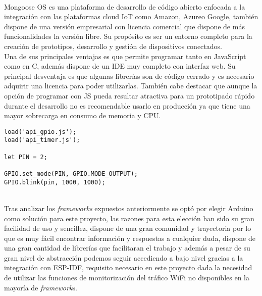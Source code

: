 \documentclass[../proyecto.tex]{subfiles}
\begin{document}
\\
Mongoose OS es una plataforma de desarrollo de código abierto enfocada a la integración con las plataformas cloud IoT como Amazon, Azureo Google, también dispone de una versión empresarial con licencia comercial que dispone de más funcionalidades la versión libre. Su propósito es ser un entorno completo para la creación de prototipos, desarrollo y gestión de dispositivos conectados.\\

Una de sus principales ventajas es que permite programar tanto en JavaScript como en C, además dispone de un IDE muy completo con interfaz web. Su principal desventaja es que algunas librerías son de código cerrado y es necesario adquirir una licencia para poder utilizarlas. También cabe destacar que aunque la opción de programar con JS pueda resultar atractiva para un prototipado rápido durante el desarrollo no es recomendable usarlo en producción ya que tiene una mayor sobrecarga en consumo de memoria y CPU.\\


\begin{minipage}{\linewidth}
\begin{lstlisting}[caption=Ejemplo de código para hacer parpadear un led con Moongose, captionpos=b, frame=single]
load('api_gpio.js');
load('api_timer.js');

let PIN = 2;

GPIO.set_mode(PIN, GPIO.MODE_OUTPUT);
GPIO.blink(pin, 1000, 1000);
\end{lstlisting}
\end{minipage}

\\

Tras analizar los \textit{frameworks} expuestos anteriormente se optó por elegir Arduino como solución para este proyecto, las razones para esta elección han sido su gran facilidad de uso  y sencillez, dispone de una gran comunidad y trayectoria por lo que es muy fácil encontrar información y respuestas a cualquier duda, dispone de una gran cantidad de librerías que facilitaran el trabajo y además a pesar de su gran nivel de abstracción podemos seguir accediendo a bajo nivel gracias a la integración con ESP-IDF, requisito necesario en este proyecto dada la necesidad de utilizar las funciones de monitorización del tráfico WiFi no disponibles en la mayoría de \textit{frameworks}.



\end{document}
